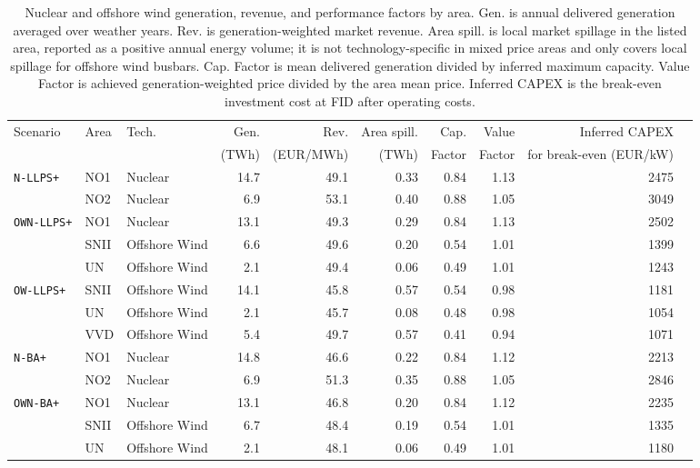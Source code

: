\begin{table}[htbp]
\centering
\caption{Nuclear and offshore wind generation, revenue, and performance factors by area. Gen. is annual delivered generation averaged over weather years. Rev. is generation-weighted market revenue. Area spill. is local market spillage in the listed area, reported as a positive annual energy volume; it is not technology-specific in mixed price areas and only covers local spillage for offshore wind busbars. Cap. Factor is mean delivered generation divided by inferred maximum capacity. Value Factor is achieved generation-weighted price divided by the area mean price. Inferred CAPEX is the break-even investment cost at FID after operating costs.}
\label{tab:nuclear_offshore_revenue}
\begin{tabular}{lllrrrrrrr}
\toprule
Scenario & Area & Tech. & Gen. & Rev. & Area spill. & Cap. & Value & Inferred CAPEX \\
         &      &       & (TWh) & (EUR/MWh) & (TWh) & Factor & Factor & for break-even (EUR/kW) \\
\midrule
\multirow{2}{*}{\texttt{N-LLPS+}} & NO1 & Nuclear & 14.7 & 49.1 & 0.33 & 0.84 & 1.13 & 2475 \\
 & NO2 & Nuclear & 6.9 & 53.1 & 0.40 & 0.88 & 1.05 & 3049 \\
\midrule
\multirow{3}{*}{\texttt{OWN-LLPS+}} & NO1 & Nuclear & 13.1 & 49.3 & 0.29 & 0.84 & 1.13 & 2502 \\
 & SNII & Offshore Wind & 6.6 & 49.6 & 0.20 & 0.54 & 1.01 & 1399 \\
 & UN & Offshore Wind & 2.1 & 49.4 & 0.06 & 0.49 & 1.01 & 1243 \\
\midrule
\multirow{3}{*}{\texttt{OW-LLPS+}} & SNII & Offshore Wind & 14.1 & 45.8 & 0.57 & 0.54 & 0.98 & 1181 \\
 & UN & Offshore Wind & 2.1 & 45.7 & 0.08 & 0.48 & 0.98 & 1054 \\
 & VVD & Offshore Wind & 5.4 & 49.7 & 0.57 & 0.41 & 0.94 & 1071 \\
\midrule
\multirow{2}{*}{\texttt{N-BA+}} & NO1 & Nuclear & 14.8 & 46.6 & 0.22 & 0.84 & 1.12 & 2213 \\
 & NO2 & Nuclear & 6.9 & 51.3 & 0.35 & 0.88 & 1.05 & 2846 \\
\midrule
\multirow{3}{*}{\texttt{OWN-BA+}} & NO1 & Nuclear & 13.1 & 46.8 & 0.20 & 0.84 & 1.12 & 2235 \\
 & SNII & Offshore Wind & 6.7 & 48.4 & 0.19 & 0.54 & 1.01 & 1335 \\
 & UN & Offshore Wind & 2.1 & 48.1 & 0.06 & 0.49 & 1.01 & 1180 \\

\end{tabular}
\end{table}
